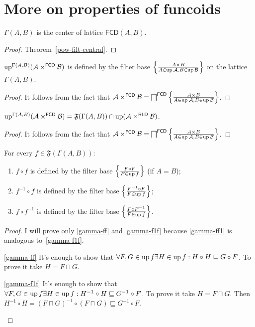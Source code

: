 \section{More on properties of funcoids}
\begin{prop}
$\Gamma(A,B)$ is the center of lattice $\mathsf{FCD}(A,B)$.\end{prop}
\begin{proof}
Theorem~\ref{pow-filt-central}.\end{proof}
\begin{prop}
$\operatorname{up}^{\Gamma(A,B)}(\mathcal{A}\times^{\mathsf{FCD}}\mathcal{B})$
is defined by the filter base $\left\{ \frac{A\times B}{A\in\operatorname{up}\mathcal{A},B\in\operatorname{up}\mathcal{B}}\right\}$
on the lattice $\Gamma(A,B)$.\end{prop}
\begin{proof}
It follows from the fact that $\mathcal{A}\times^{\mathsf{FCD}}\mathcal{B}=\bigsqcap^{\mathsf{FCD}}\left\{ \frac{A\times B}{A\in\operatorname{up}\mathcal{A},B\in\operatorname{up}\mathcal{B}}\right\}$.\end{proof}
\begin{prop}
$\operatorname{up}^{\Gamma(A,B)}(\mathcal{A}\times^{\mathsf{FCD}}\mathcal{B})=\mathfrak{F}(\Gamma(A,B))\cap\operatorname{up}(\mathcal{A}\times^{\mathsf{RLD}}\mathcal{B})$.\end{prop}
\begin{proof}
It follows from the fact that $\mathcal{A}\times^{\mathsf{FCD}}\mathcal{B}=\bigsqcap^{\mathsf{FCD}}\left\{ \frac{A\times B}{A\in\operatorname{up}\mathcal{A},B\in\operatorname{up}\mathcal{B}}\right\}$.\end{proof}
\begin{prop}
For every $f\in\mathfrak{F}(\Gamma(A,B))$:
\begin{enumerate}
\item \label{gamma-ff}$f\circ f$ is defined by the filter base $\left\{ \frac{F\circ F}{F\in\operatorname{up} f}\right\}$
(if $A=B$);
\item \label{gamma-f1f}$f^{-1}\circ f$ is defined by the filter base $\left\{ \frac{F^{-1}\circ F}{F\in\operatorname{up} f}\right\}$;
\item \label{gamma-ff1}$f\circ f^{-1}$ is defined by the filter base $\left\{ \frac{F\circ F^{-1}}{F\in\operatorname{up} f}\right\}$.
\end{enumerate}
\end{prop}
\begin{proof}
I will prove only \ref{gamma-ff} and \ref{gamma-f1f} because \ref{gamma-ff1}
is analogous to~\ref{gamma-f1f}.
\begin{widedisorder}
\item [{\ref{gamma-ff}}] It's enough to show that $\forall F,G\in\operatorname{up} f\exists H\in\operatorname{up} f:H\circ H\sqsubseteq G\circ F$.
To prove it take $H=F\sqcap G$.
\item [{\ref{gamma-f1f}}] It's enough to show that $\forall F,G\in\operatorname{up} f\exists H\in\operatorname{up} f:H^{-1}\circ H\sqsubseteq G^{-1}\circ F$.
To prove it take $H=F\sqcap G$. Then $H^{-1}\circ H=(F\sqcap G)^{-1}\circ(F\sqcap G)\sqsubseteq G^{-1}\circ F$.
\end{widedisorder}
\end{proof}
